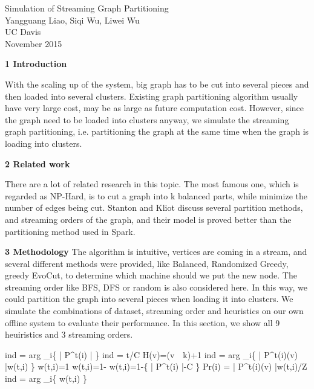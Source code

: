 \documentclass[12pt]{article}
\begin{document}
\begin {center}
{\large  Simulation of Streaming Graph Partitioning} \\
Yangguang Liao, Siqi Wu, Liwei Wu \\
UC Davis\\
November 2015
\end {center}

\textbf{1 Introduction}

With the scaling up of the system, big graph has to be cut into several pieces and then loaded into several clusters. Existing graph partitioning algorithm usually have very large cost, may be as large as future computation cost. However, since the graph need to be loaded into clusters anyway, we simulate the streaming graph partitioning, i.e. partitioning the graph at the same time when the graph is loading into clusters. 

\textbf{2 Related work}

There are a lot of related research in this topic. The most famous one, which is regarded as NP-Hard, is to cut a graph into k balanced parts, while minimize the number of edges being cut. Stanton and Kliot discuss several partition methods, and streaming orders of the graph, and their model is proved better than the partitioning method used in Spark.

\textbf{3 Methodology}
The algorithm is intuitive, vertices are coming in a stream, and several different methods were provided, like Balanced, Randomized Greedy, greedy EvoCut, to determine which machine should we put the new node. The streaming order like BFS, DFS or random is also considered here. In this way, we could partition the graph into several pieces when loading it into clusters. We simulate the combinations of dataset, streaming order and heuristics on our own offline system to evaluate their performance. 
In this section, we show all 9 heuiristics and 3 streaming orders.

ind = arg \min_{i\in \left [ k \right ]}\left \{ \left | P^{t}(i) \right | \right \}
ind = \left \lceil t/C \right \rceil
H(v)=(v\ \ k)+1
ind = arg \max_{i\in \left [ k \right ]}\left \{ \left | P^{t}(i)\bigcap \Gamma (v) \right |w(t,i) \right \}
w(t,i)=1
w(t,i)=1-
w(t,i)=1-\left \{ \left | P^{t}(i) \right |-C \right \}
Pr(i) =  \left | P^{t}(i)\bigcap \Gamma (v) \right |w(t,i)/Z
ind = arg \max_{i\in \left [ k \right ]}\left \{ w(t,i) \right \}
\end{document}
